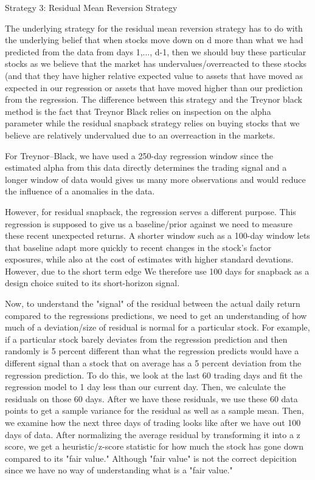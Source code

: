 \quad

Strategy 3: Residual Mean Reversion Strategy

The underlying strategy for the residual mean reversion strategy has to do with the underlying belief that when stocks move down on d more than what we had predicted from the data from days 1,..., d-1, then we should buy these particular stocks as we believe that the market has undervalues/overreacted to these stocks (and that they have higher relative expected value to assets that have moved as expected in our regression or assets that have moved higher than our prediction from the regression. The difference between this strategy and the Treynor black method is the fact that Treynor Black relies on inspection on the alpha parameter while the residual snapback strategy relies on buying stocks that we believe are relatively undervalued due to an overreaction in the markets.

For Treynor–Black, we have used a 250-day regression window since the estimated alpha from this data directly determines the trading signal and a longer window of data would gives us many more observations and would reduce the influence of a  anomalies in the data. 

However, for residual snapback, the regression serves a different purpose. This regression is supposed to give us a baseline/prior against we need to measure these recent unexpected returns. A shorter window such as a 100-day window lets that baseline adapt more quickly to recent changes in the stock’s factor exposures, while also at the cost of estimates with higher standard devations.  However, due to the short term edge We therefore use 100 days for snapback as a design choice suited to its short-horizon signal.
\quad

Now, to understand the "signal" of the residual between the actual daily return compared to the regressions predictions, we need to get an understanding of how much of a deviation/size of residual is normal for a particular stock. For example, if a particular stock barely deviates from the regression prediction and then randomly is 5 percent different than what the regression predicts would have a different signal than a stock that on average has a 5 percent deviation from the regression prediction. To do this, we look at the last 60 trading days and fit the regression model to 1 day less than our current day. Then, we calculate the residuals on those 60 days. After we have these residuals, we use these 60 data points to get a sample variance for the residual as well as a sample mean. Then, we examine how the next three days of trading looks like after we have out 100 days of data. After normalizing the average residual by transforming it into a z score, we get a heuristic/z-score statistic for how much the stock has gone down compared to its "fair value." Although "fair value" is not the correct depicition since we have no way of understanding what is a "fair value." 

